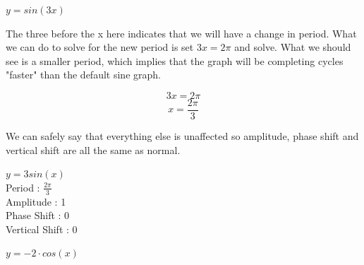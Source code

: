 \documentclass[10pt,letterpaper]{amspset}
\begin{document}
\pagebreak


\begin{problem}[2]
    $y = sin(3x)$
\end{problem}

\begin{solution}[Solution]
    The three before the x here indicates that we will have a change in period. What we can do to solve for the new period is set $3x = 2\pi$ and solve. What we should see is a smaller period, which implies that the graph will be completing cycles "faster" than the default sine graph. 
    
    \[ 3x = 2\pi \]
    \[\boxed{ x = \frac{2\pi}{3} }\]
    
    We can safely say that everything else is unaffected so amplitude, phase shift and vertical shift are all the same as normal.
    \medskip 
    
    
    \noindent $y = 3 sin(x)$ \\[+2mm]
    Period : $\frac{2\pi}{3}$ \\[+2mm]
    Amplitude : 1 \\[+2mm]
    Phase Shift : 0 \\[+2mm]
    Vertical Shift : 0 \\
   
   
\end{solution}


\pagebreak


\begin{problem}[3]
    $y = -2 \cdot cos(x)$
\end{problem}
\end{document}
